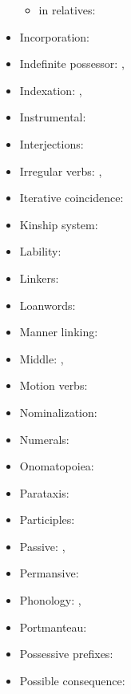 \documentclass[oldfontcommands,oneside,a4paper,11pt]{article}
\begin{document}
\begin{itemize}
\begin{itemize}
\item in relatives: \citet[275]{japhug14ideophones}
\end{itemize}
\item Incorporation: \citet{jacques12incorp}
\item Indefinite possessor: \citet[1212]{jacques12incorp}, \citet[4]{jacques14antipassive}
\item Indexation: \citet{jacques10inverse}, \citet[85]{jacques12agreement}
\item Instrumental: \citet{jacques16comparative}
\item Interjections: \citet[283]{japhug14ideophones}
\item Irregular verbs: \citet[91]{jacques12agreement}, \citet[1215]{jacques12incorp}
\item Iterative coincidence: \citet[296]{jacques14linking}
\item Kinship system: \citet{jacques11kinship}
\item Lability: \citet[216-9]{jacques12demotion}
\item Linkers:  \citet[276-7]{jacques14linking}
\item Loanwords: \citet[83-199]{jacques04these}
\item Manner linking:  \citet[320-5]{jacques14linking}
\item Middle:  \citet{jacques12demotion}, \citet{jacques15spontaneous}
\item Motion verbs: \citet[201-6]{jacques13harmonization}
\item Nominalization: \citet[5-7]{jacques14antipassive}
\item Numerals: \citet[4]{jacques14antipassive}
\item Onomatopoiea:   \citet[282]{japhug14ideophones}
\item Parataxis:  \citet[312;315]{jacques14linking}
\item Participles: \citet[5-6]{jacques14antipassive}
\item Passive: \citet{jacques07passif}, \citet[208-13]{jacques12demotion}
\item Permansive: \citet{jacques15spontaneous}
\item Phonology: \citet[12-82]{jacques04these}, \citet{jacques08}
\item Portmanteau: \citet[136-7]{jacques10inverse}
\item Possessive prefixes: \citet[4]{jacques14antipassive}
\item Possible consequence:  \citet[308-311]{jacques14linking}

\end{itemize}
\end{document}
